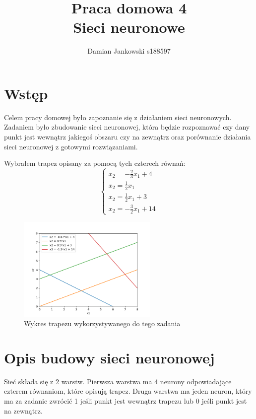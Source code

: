 \documentclass{article}
\title{Praca domowa 4\\Sieci neuronowe}
\author{Damian Jankowski s188597}
\begin{document}
\maketitle

\section{Wstęp}

Celem pracy domowej było zapoznanie się z działaniem sieci neuronowych.
Zadaniem było zbudowanie sieci neuronowej, która będzie rozpoznawać czy dany
punkt jest wewnątrz jakiegoś obszaru czy na zewnątrz oraz porównanie
działania sieci neuronowej z gotowymi rozwiązaniami.


Wybrałem trapez opisany za pomocą tych czterech równań:
\begin{equation}
    \begin{cases}
        x_2 = -\frac{2}{3}x_1+4 \\
        x_2 = \frac{1}{2}x_1 \\
        x_2 = \frac{1}{2}x_1 + 3 \\
        x_2 = -\frac{3}{2}x_1 + 14
    \end{cases}
\end{equation}
\begin{figure}[H]
    \centering
    \includegraphics[width=0.6\textwidth]{trapez.png}
    \caption{Wykres trapezu wykorzystywanego do tego zadania}
\end{figure}

\section{Opis budowy sieci neuronowej}

Sieć składa się z 2 warstw. Pierwsza warstwa ma 4 neurony odpowiadające
czterem równaniom, które opisują trapez. Druga warstwa ma jeden neuron, który
ma za zadanie zwrócić 1 jeśli punkt jest wewnątrz trapezu lub 0 jeśli punkt
jest na zewnątrz.
\end{document}
